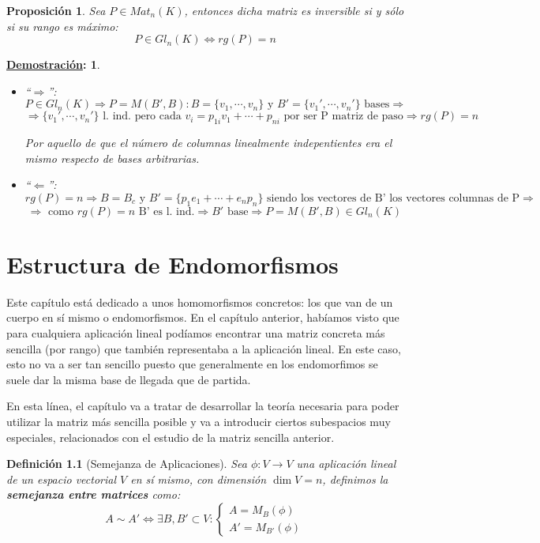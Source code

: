 \documentclass[10pt,a4paper,openright]{book}
\theoremstyle{break}
\newtheorem*{defi}{Definición}
\newtheorem*{prop}{Proposición}
\newtheorem*{demo}{\underline{Demostración}:}
\begin{document}
\begin{prop}
Sea $P\in Mat_n(K)$, entonces dicha matriz es inversible si y sólo si su rango es máximo:
$$P\in Gl_n(K)\Leftrightarrow rg(P)=n$$
\end{prop}
\begin{demo}
\begin{itemize}
\item ``$\Rightarrow $'':
$$P\in Gl_n(K)\Rightarrow P=M(B',B): B=\{v_1, \cdots, v_n\}\mbox{ y }B'=\{v_1', \cdots, v_n'\}\mbox{ bases}\Rightarrow $$
$$\Rightarrow \{v_1',\cdots, v_n'\}\mbox{ l. ind. pero cada }v_i=p_{1i}v_1+\cdots+p_{ni}\mbox{ por ser P matriz de paso}\Rightarrow rg(P)=n$$

Por aquello de que el número de columnas linealmente indepentientes era el mismo respecto de bases arbitrarias.


\item ``$\Leftarrow$'':
$$rg(P)=n\Rightarrow B=B_c \mbox{ y }B'=\{p_1e_1+\cdots+e_np_n\}\mbox{ siendo los vectores de B' los vectores columnas de P}\Rightarrow $$
$$\Rightarrow \mbox{ como }rg(P)=n\mbox{ B' es l. ind.}\Rightarrow B'\mbox{ base}\Rightarrow P=M(B',B)\in Gl_n(K)$$

\end{itemize}
\end{demo}

\chapter{Estructura de Endomorfismos}
Este capítulo está dedicado a unos homomorfismos concretos: los que van de un cuerpo en sí mismo o endomorfismos. En el capítulo anterior, habíamos visto que para cualquiera aplicación lineal podíamos encontrar una matriz concreta más sencilla (por rango) que también representaba a la aplicación lineal. En este caso, esto no va a ser tan sencillo puesto que generalmente en los endomorfimos se suele dar la misma base de llegada que de partida.

En esta línea, el capítulo va a tratar de desarrollar la teoría necesaria para poder utilizar la matriz más sencilla posible y va a introducir ciertos subespacios muy especiales, relacionados con el estudio de la matriz sencilla anterior.

\begin{defi}[Semejanza de Aplicaciones]
Sea $\phi: V\rightarrow V$ una aplicación lineal de un espacio vectorial $V$ en sí mismo, con dimensión $\dim V = n$, definimos la \textbf{semejanza entre matrices} como:
$$
A\sim A' \Leftrightarrow \exists B, B'\subset V : \begin{cases}
A=M_{B}(\phi) \\ A'=M_{B'}(\phi) \end{cases}
$$
\end{defi}
\end{document}
